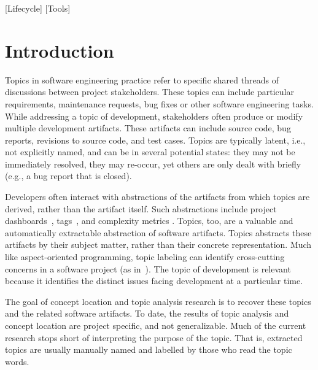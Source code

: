 \documentclass[]{sig-alternate}
\begin{document}
[Lifecycle]
[Tools]



\newcommand{\shrink}{}

\section{Introduction}
Topics in software engineering practice refer to specific shared threads of discussions between project stakeholders. 
These topics can include particular requirements, maintenance requests, bug fixes or other software engineering tasks. %
While addressing a topic of development, stakeholders often produce or modify multiple development artifacts.
%
These artifacts can include source code, bug reports, revisions to source code, and test cases. 
%
Topics are typically latent, i.e., not explicitly named, and can be in several potential states: they may not be immediately resolved, they may re-occur, yet others are only dealt with briefly  (e.g., a bug report that is closed).

Developers often interact with abstractions of the artifacts from which topics are derived, rather than the artifact itself. 
Such abstractions include project dashboards~\cite{kersten2005mylar}, tags~\cite{treude2010}, and complexity metrics \cite{mccabe1976complexity}. 
Topics, too, are a valuable and automatically extractable abstraction of software artifacts.
Topics abstracts these artifacts by their subject matter, rather than their concrete representation. 
Much like aspect-oriented programming, topic labeling can identify cross-cutting concerns in a software project (as in~\cite{Baldi2008}).
The topic of development is relevant because it identifies the distinct issues facing development at a particular time.

The goal of concept location and topic analysis research is to recover these topics and the related software artifacts.
To date, the results of topic analysis and concept location are project specific, and not generalizable.
Much of the current research stops short of interpreting the purpose of the topic. 
That is, extracted topics are usually manually named and labelled by those who read the topic words.
\end{document}
